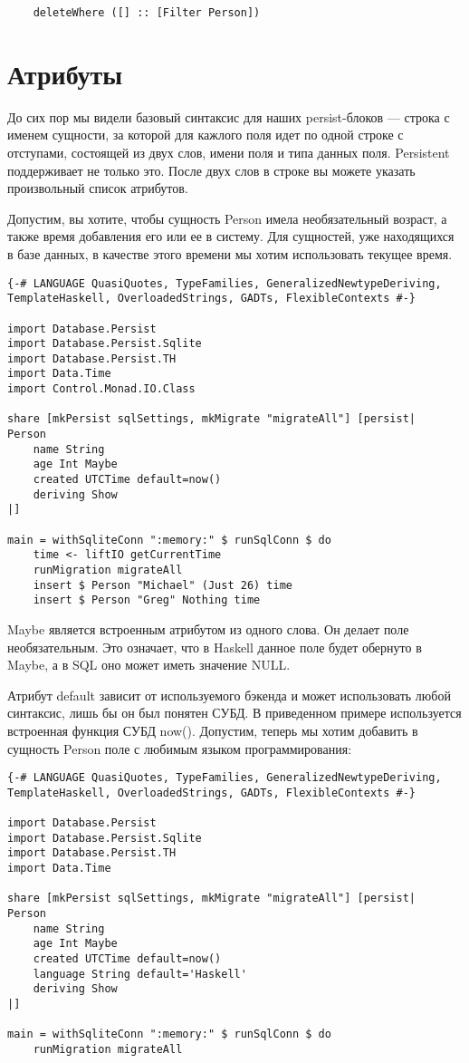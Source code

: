 \begin{lstlisting}
    deleteWhere ([] :: [Filter Person])
\end{lstlisting}

\section{Атрибуты} %

До сих пор мы видели базовый синтаксис для наших persist-блоков --- строка с именем сущности, за которой для кажлого поля идет по одной строке с отступами, состоящей из двух слов, имени поля и типа данных поля. Persistent поддерживает не только это. После двух слов в строке вы можете указать произвольный список атрибутов.

Допустим, вы хотите, чтобы сущность Person имела необязательный возраст, а также время добавления его или ее в систему. Для сущностей, уже находящихся в базе данных, в качестве этого времени мы хотим использовать текущее время.

\begin{lstlisting}
{-# LANGUAGE QuasiQuotes, TypeFamilies, GeneralizedNewtypeDeriving, TemplateHaskell, OverloadedStrings, GADTs, FlexibleContexts #-}

import Database.Persist
import Database.Persist.Sqlite
import Database.Persist.TH
import Data.Time
import Control.Monad.IO.Class

share [mkPersist sqlSettings, mkMigrate "migrateAll"] [persist|
Person
    name String
    age Int Maybe
    created UTCTime default=now()
    deriving Show
|]

main = withSqliteConn ":memory:" $ runSqlConn $ do
    time <- liftIO getCurrentTime
    runMigration migrateAll
    insert $ Person "Michael" (Just 26) time
    insert $ Person "Greg" Nothing time
\end{lstlisting}%

Maybe является встроенным атрибутом из одного слова. Он делает поле необязательным. Это означает, что в Haskell данное поле будет обернуто в Maybe, а в SQL оно может иметь значение NULL.

Атрибут default зависит от используемого бэкенда и может использовать любой синтаксис, лишь бы он был понятен СУБД. В приведенном примере используется встроенная функция СУБД now(). Допустим, теперь мы хотим добавить в сущность Person поле с любимым языком программирования:

\begin{lstlisting}
{-# LANGUAGE QuasiQuotes, TypeFamilies, GeneralizedNewtypeDeriving, TemplateHaskell, OverloadedStrings, GADTs, FlexibleContexts #-}

import Database.Persist
import Database.Persist.Sqlite
import Database.Persist.TH
import Data.Time

share [mkPersist sqlSettings, mkMigrate "migrateAll"] [persist|
Person
    name String
    age Int Maybe
    created UTCTime default=now()
    language String default='Haskell'
    deriving Show
|]

main = withSqliteConn ":memory:" $ runSqlConn $ do
    runMigration migrateAll
\end{lstlisting}%

